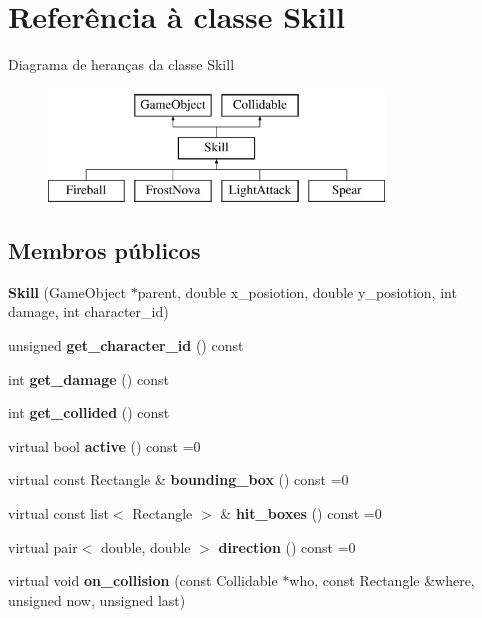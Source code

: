 \hypertarget{classSkill}{}\section{Referência à classe Skill}
\label{classSkill}
Diagrama de heranças da classe Skill\begin{figure}[H]
\begin{center}
\leavevmode
\includegraphics[height=3.000000cm]{classSkill}
\end{center}
\end{figure}
\subsection*{Membros públicos}
\begin{DoxyCompactItemize}
\item 
\mbox{\label{classSkill_a179f277e58924d53051eae66896b3a74}} 
{\bfseries Skill} (Game\+Object $\ast$parent, double x\+\_\+posiotion, double y\+\_\+posiotion, int damage, int character\+\_\+id)
\item 
\mbox{\label{classSkill_a69293c2a9324f011147d444aee01e319}} 
unsigned {\bfseries get\+\_\+character\+\_\+id} () const
\item 
\mbox{\label{classSkill_ae24133703ea9307d93ea305115dc0175}} 
int {\bfseries get\+\_\+damage} () const
\item 
\mbox{\label{classSkill_a43a9dd5e3862f3698fe1b92724a6ab72}} 
int {\bfseries get\+\_\+collided} () const
\item 
\mbox{\label{classSkill_a1744c0c7f03304b1a0444a1bd95661c0}} 
virtual bool {\bfseries active} () const =0
\item 
\mbox{\label{classSkill_aa8b6a26b2f3586ca28b354f2da132e09}} 
virtual const Rectangle \& {\bfseries bounding\+\_\+box} () const =0
\item 
\mbox{\label{classSkill_a9973d969044e6972e36338928b5c4571}} 
virtual const list$<$ Rectangle $>$ \& {\bfseries hit\+\_\+boxes} () const =0
\item 
\mbox{\label{classSkill_a503e88f6eb131a401c7a7a49d87b1ab0}} 
virtual pair$<$ double, double $>$ {\bfseries direction} () const =0
\item 
\mbox{\label{classSkill_ae236be2ad572352fdf5f1e69eabe3dd3}} 
virtual void {\bfseries on\+\_\+collision} (const Collidable $\ast$who, const Rectangle \&where, unsigned now, unsigned last)
\end{DoxyCompactItemize}

